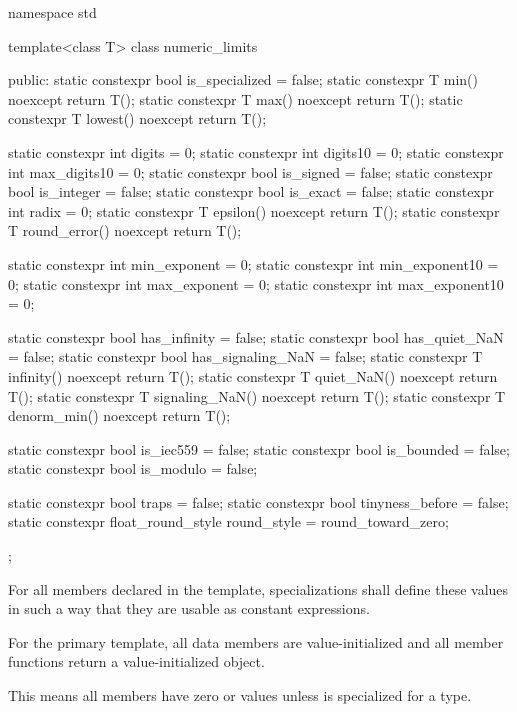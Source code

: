 %
\begin{codeblock}
namespace std {
  template<class T> class numeric_limits {
  public:
    static constexpr bool is_specialized = false;
    static constexpr T min() noexcept { return T(); }
    static constexpr T max() noexcept { return T(); }
    static constexpr T lowest() noexcept { return T(); }

    static constexpr int  digits = 0;
    static constexpr int  digits10 = 0;
    static constexpr int  max_digits10 = 0;
    static constexpr bool is_signed = false;
    static constexpr bool is_integer = false;
    static constexpr bool is_exact = false;
    static constexpr int  radix = 0;
    static constexpr T epsilon() noexcept { return T(); }
    static constexpr T round_error() noexcept { return T(); }

    static constexpr int  min_exponent = 0;
    static constexpr int  min_exponent10 = 0;
    static constexpr int  max_exponent = 0;
    static constexpr int  max_exponent10 = 0;

    static constexpr bool has_infinity = false;
    static constexpr bool has_quiet_NaN = false;
    static constexpr bool has_signaling_NaN = false;
    static constexpr T infinity() noexcept { return T(); }
    static constexpr T quiet_NaN() noexcept { return T(); }
    static constexpr T signaling_NaN() noexcept { return T(); }
    static constexpr T denorm_min() noexcept { return T(); }

    static constexpr bool is_iec559 = false;
    static constexpr bool is_bounded = false;
    static constexpr bool is_modulo = false;

    static constexpr bool traps = false;
    static constexpr bool tinyness_before = false;
    static constexpr float_round_style round_style = round_toward_zero;
  };
}
\end{codeblock}

\pnum
For all members declared
 
in the
template, specializations shall define these values in such a way
that they are usable as
constant expressions.

\pnum
For the
primary template, all data members are value-initialized and all
member functions return a value-initialized object.
\begin{note}
This means all members have zero or  values
unless  is specialized for a type.
\end{note}

